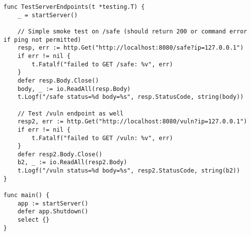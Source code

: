 \documentclass{article}
\begin{document}
\begin{lstlisting}[caption={Example server implementation using Go and the Fiber framework}, label={lst:go-server}, showspaces=false,showstringspaces=false]
func TestServerEndpoints(t *testing.T) {
	_ = startServer()

	// Simple smoke test on /safe (should return 200 or command error if ping not permitted)
	resp, err := http.Get("http://localhost:8080/safe?ip=127.0.0.1")
	if err != nil {
		t.Fatalf("failed to GET /safe: %v", err)
	}
	defer resp.Body.Close()
	body, _ := io.ReadAll(resp.Body)
	t.Logf("/safe status=%d body=%s", resp.StatusCode, string(body))

	// Test /vuln endpoint as well
	resp2, err := http.Get("http://localhost:8080/vuln?ip=127.0.0.1")
	if err != nil {
		t.Fatalf("failed to GET /vuln: %v", err)
	}
	defer resp2.Body.Close()
	b2, _ := io.ReadAll(resp2.Body)
	t.Logf("/vuln status=%d body=%s", resp2.StatusCode, string(b2))
}

func main() {
	app := startServer()
	defer app.Shutdown()
	select {}
}

\end{lstlisting}
\end{document}
